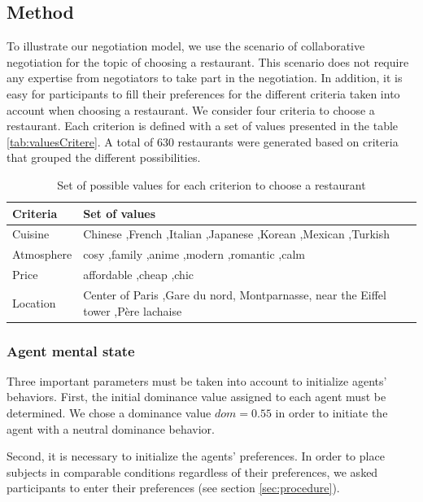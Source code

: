 \documentclass[10pt, a4paper]{article} %
\begin{document}
	\subsection{Method}
		\label{sec:methodo}
		
		To illustrate our negotiation model, we use the scenario of collaborative negotiation for the topic of choosing a restaurant.
		This scenario does not require any expertise from negotiators to take part in the negotiation. 
		In addition, it is easy for participants to fill their preferences for the different criteria taken into account when choosing a restaurant.
		We consider four criteria to choose a restaurant. Each criterion is defined with a set of values presented in the table \ref{tab:valuesCritere}. A total of 630 restaurants were generated based on criteria that grouped the different possibilities.
		
	\begin{table}[h]
		\caption{Set of possible values for each criterion to choose a restaurant}
		\label{tab:valuesCriteria}
			\centering
			\begin{tabular}{p{1.6cm}| p{5.5cm}}
				\hline
				\hline
				\textbf{Criteria} & \textbf{Set of values} \\
				\hline
				Cuisine & Chinese ,French ,Italian ,Japanese ,Korean ,Mexican ,Turkish \\
				\hline
				Atmosphere & cosy ,family ,anime ,modern ,romantic ,calm \\
				\hline 
				Price & affordable ,cheap ,chic \\
				\hline
				Location & Center of Paris ,Gare du nord, Montparnasse, near the Eiffel tower ,Père lachaise \\
				\hline
				\hline
				\end{tabular}
			\end{table}
	
	\subsubsection{Agent mental state}		
		Three important parameters must be taken into account to initialize agents' behaviors. 
		First, the initial dominance value assigned to each agent must be determined. We chose a dominance value $dom =0.55$ in order to initiate the agent with a neutral dominance behavior.
	
		Second, it is necessary to initialize the agents' preferences. In order to place subjects in comparable conditions regardless of their preferences, we asked participants to enter their preferences (see section \ref{sec:procedure}).
	
\end{document}
